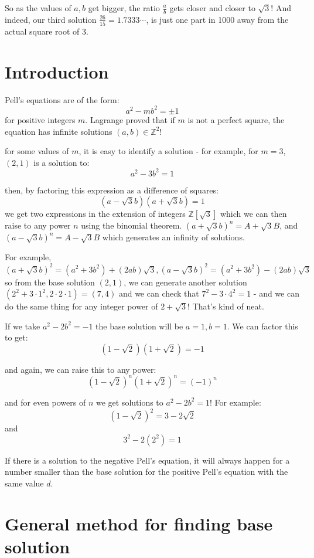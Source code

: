 \documentclass{article}
\begin{document}
So as the values of $a,b$ get bigger, the ratio $\frac{a}{b}$ gets closer and closer to $\sqrt{3}$!
And indeed, our third solution $\frac{26}{15} = 1.7333\cdots$, is just one part in 1000 away
from the actual square root of 3.

\section{Introduction}

Pell's equations are of the form:
\[ a^2-mb^2 = \pm 1 \]
for positive integers $m$. Lagrange proved that if $m$ is not a perfect square, the equation has infinite solutions $(a,b) \in \mathbb{Z}^2$!

for some values of $m$, it is easy to identify a solution - for example, for $m=3$, $(2,1)$ is a solution to:
\[a^2-3b^2=1 \]

then, by factoring this expression as a difference of squares:
\[(a-\sqrt{3}b)(a+\sqrt{3}b) = 1 \]
we get two expressions in the extension of integers $\mathbb{Z}[\sqrt{3}]$ which we can then raise to any power $n$ using the binomial theorem. $(a+\sqrt{3}b)^n = A + \sqrt{3}B$, and $(a-\sqrt{3}b)^n = A-\sqrt{3}B$ which generates an infinity of solutions.

For example, $(a+\sqrt{3}b)^2 = (a^2+3b^2) + (2ab)\sqrt{3}, (a-\sqrt{3}b)^2 = (a^2+3b^2)-(2ab)\sqrt{3}$ so from the base solution $(2,1)$, we can generate another solution $(2^2+3\cdot1^2,2\cdot2\cdot1) = (7,4)$ and we can check that $7^2-3\cdot4^2=1$ - and we can do the same thing for any integer power of $2+\sqrt{3}$! That's kind of neat.

If we take $a^2 - 2b^2 = -1$ the base solution will be $a=1, b=1$. We can factor this to get:
\[ (1-\sqrt{2})(1+\sqrt{2}) = -1 \]

and again, we can raise this to any power:
\[ (1-\sqrt{2})^n(1+\sqrt{2})^n = (-1)^n \]

and for even powers of $n$ we get solutions to $a^2-2b^2=1$! For example:
\[ (1-\sqrt{2})^2 = 3-2\sqrt{2} \]
and
\[ 3^2 - 2(2^2) = 1 \]

If there is a solution to the negative Pell's equation, it will always happen for a
number smaller than the base solution for the positive Pell's equation with the same value $d$.

\section{General method for finding base solution}
\end{document}
